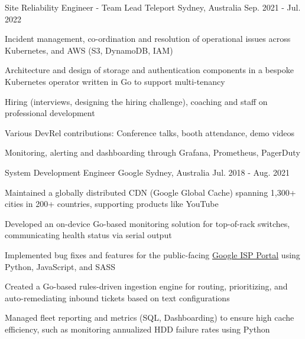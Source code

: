 \begin{cventries}
  \cventry
    {Site Reliability Engineer - Team Lead} %
    {Teleport} %
    {Sydney, Australia} %
    {Sep. 2021 - Jul. 2022} %
    {
      \begin{cvitems} %
      \item {Incident management, co-ordination and resolution of operational issues across Kubernetes, and AWS (S3, DynamoDB, IAM)}
        \item {Architecture and design of storage and authentication components in a bespoke Kubernetes operator written in Go to support multi-tenancy}
        \item {Hiring (interviews, designing the hiring challenge), coaching and staff on professional development}
        \item {Various DevRel contributions: Conference talks, booth attendance, demo videos }
        \item {Monitoring, alerting and dashboarding through Grafana, Prometheus, PagerDuty}
      \end{cvitems}
    }


  \cventry
    {System Development Engineer} %
    {Google} %
    {Sydney, Australia} %
    {Jul. 2018 - Aug. 2021} %
    {
    \begin{cvitems}
      \item {Maintained a globally distributed CDN (Google Global Cache) spanning 1,300+ cities in 200+ countries, supporting products like YouTube}
      \item {Developed an on-device Go-based monitoring solution for top-of-rack switches, communicating health status via serial output}
      \item {Implemented bug fixes and features for the public-facing \href{https://peering.google.com/}{Google ISP Portal} using Python, JavaScript, and SASS}
      \item {Created a Go-based rules-driven ingestion engine for routing, prioritizing, and auto-remediating inbound tickets based on text configurations}
      \item {Managed fleet reporting and metrics (SQL, Dashboarding) to ensure high cache efficiency, such as monitoring annualized HDD failure rates using Python}
    \end{cvitems}
  }


\end{cventries}
